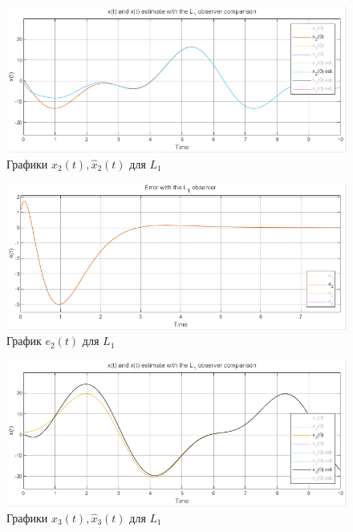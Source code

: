 \documentclass[a4paper, 12pt]{article}
\begin{document}
    \newpage
    \vspace*{5mm}
    \begin{figure}[H]
        \centering
        \includegraphics[scale=0.7]{2task_x2comp_L1.png}
        \captionsetup{skip=0pt}
        \caption{Графики $x_2(t),\hat{x}_2(t)$ для $L_1$}
        \label{fig:2task_x2comp_L1}
    \end{figure}
    \begin{figure}[H]
        \centering
        \includegraphics[scale=0.7]{2task_e2_L1.png}
        \captionsetup{skip=0pt}
        \caption{График $e_2(t)$ для $L_1$}
        \label{fig:2task_e2_L1}
    \end{figure}
    \begin{figure}[H]
        \centering
        \includegraphics[scale=0.7]{2task_x3comp_L1.png}
        \captionsetup{skip=0pt}
        \caption{Графики $x_3(t),\hat{x}_3(t)$ для $L_1$}
        \label{fig:2task_x3comp_L1}
    \end{figure}
\end{document}
